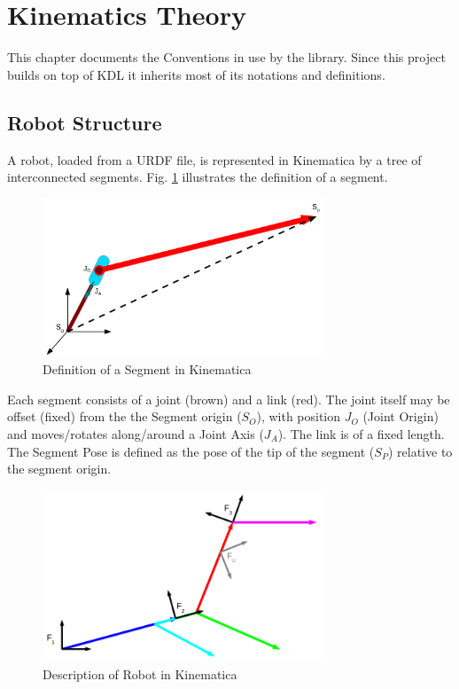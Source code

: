 \documentclass[12pt,a4paper,onecolumn]{article}
\begin{document}
\newpage
\section{Kinematics Theory}
\label{THEORY}
This chapter documents the Conventions in use by the library. Since this project builds on top of KDL it inherits most of its notations and definitions.

\subsection{Robot Structure}
A robot, loaded from a URDF file, is represented in Kinematica by a tree of interconnected segments. Fig. \ref{FIG_SEGMENT_DEFINITION} illustrates the definition of a segment.
\begin{figure}[h]
	\centering
    \includegraphics[width=0.75\textwidth]{Segment.png}
    \caption{Definition of a Segment in Kinematica}
   	\label{FIG_SEGMENT_DEFINITION}
\end{figure}

\noindent Each segment consists of a joint (brown) and a link (red). The joint itself may be offset (fixed) from the the Segment origin ($S_O$), with position $J_O$ (Joint Origin) and moves/rotates along/around a Joint Axis ($J_A$). The link is of a fixed length. The Segment Pose is defined as the pose of the tip of the segment ($S_P$) relative to the segment origin.

\begin{figure}[!htp]
	\centering
    \includegraphics[width=0.75\textwidth]{Robot_Tree.png}
    \caption{Description of Robot in Kinematica}
   	\label{FIG_ROBOT_TREE_DEFINITION}
\end{figure}
\end{document}
